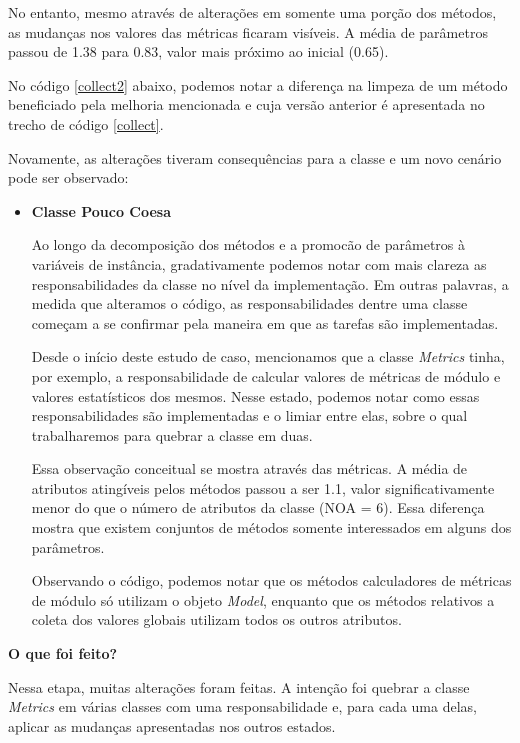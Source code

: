 No entanto, mesmo através de alterações em somente uma porção dos métodos, as
mudanças nos valores das métricas ficaram visíveis. A média de parâmetros passou
de 1.38 para 0.83, valor mais próximo ao inicial (0.65).

No código \ref{collect2} abaixo, podemos notar a diferença na limpeza de um método
beneficiado pela melhoria mencionada e cuja versão anterior é apresentada no trecho
de código \ref{collect}.



Novamente, as alterações tiveram consequências para a classe e um novo cenário pode
ser observado:

\begin{itemize}
\item
\textbf{Classe Pouco Coesa}

Ao longo da decomposição dos métodos e a promocão de parâmetros à variáveis de instância,
gradativamente podemos notar com mais clareza as responsabilidades da classe no nível da
implementação. Em outras palavras, a medida que alteramos o código, as responsabilidades
dentre uma classe começam a se confirmar pela maneira em que as tarefas são implementadas.

Desde o início deste estudo de caso, mencionamos que a classe \textit{Metrics} tinha, por exemplo, a
responsabilidade de calcular valores de métricas de módulo e valores estatísticos dos mesmos.
Nesse estado, podemos notar como essas responsabilidades são implementadas e o limiar entre elas,
sobre o qual trabalharemos para quebrar a classe em duas.

Essa observação conceitual se mostra através das métricas. A média de atributos atingíveis
pelos métodos passou a ser 1.1, valor significativamente menor do que o número de atributos
da classe (NOA = 6). Essa diferença mostra que existem conjuntos de métodos somente interessados
em alguns dos parâmetros.

Observando o código, podemos notar que os métodos calculadores de métricas de módulo só utilizam
o objeto \textit{Model}, enquanto que os métodos relativos a coleta dos valores globais utilizam
todos os outros atributos.

\end{itemize}


\vskip 0.5cm
\textbf{O que foi feito?}

Nessa etapa, muitas alterações foram feitas. A intenção foi quebrar a classe \textit{Metrics}
em várias classes com uma responsabilidade e, para cada uma delas, aplicar as mudanças apresentadas
nos outros estados.


